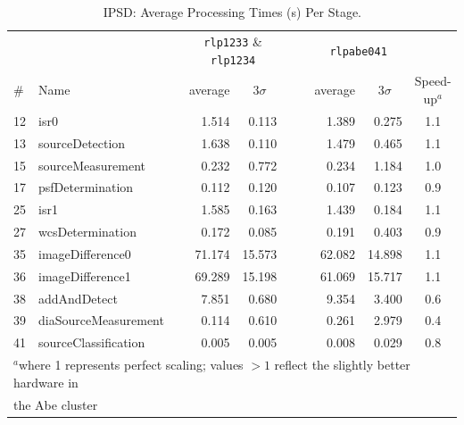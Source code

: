 \begin{table}[htbp]
\begin{center}
\caption{IPSD: Average Processing Times (s) Per Stage. 
\label{ex:tbl:allscislices}}
\vspace{\baselineskip}
\begin{tabular}{llcrrc|crr|c}
\hline\hline
   &      && \multicolumn{2}{c}{{\tt rlp1233} \& {\tt rlp1234}} 
         &&& \multicolumn{2}{c|}{{\tt rlpabe041}} & \\
\# & Name && \multicolumn{1}{c}{average}&\multicolumn{1}{c}{$3\sigma$} 
         &&& \multicolumn{1}{c}{average}&\multicolumn{1}{c|}{$3\sigma$} 
   & Speed-up$^a$ \\ 
\hline
12 &                 isr0 &&  1.514 &  0.113 &&&  1.389 &  0.275 & 1.1 \\  %
13 &      sourceDetection &&  1.638 &  0.110 &&&  1.479 &  0.465 & 1.1 \\  %
15 &    sourceMeasurement &&  0.232 &  0.772 &&&  0.234 &  1.184 & 1.0 \\  %
17 &     psfDetermination &&  0.112 &  0.120 &&&  0.107 &  0.123 & 0.9 \\  %
25 &                 isr1 &&  1.585 &  0.163 &&&  1.439 &  0.184 & 1.1 \\  %
27 &     wcsDetermination &&  0.172 &  0.085 &&&  0.191 &  0.403 & 0.9 \\  %
35 &     imageDifference0 && 71.174 & 15.573 &&& 62.082 & 14.898 & 1.1 \\  %
36 &     imageDifference1 && 69.289 & 15.198 &&& 61.069 & 15.717 & 1.1 \\  %
38 &         addAndDetect &&  7.851 &  0.680 &&&  9.354 &  3.400 & 0.6 \\  %
39 & diaSourceMeasurement &&  0.114 &  0.610 &&&  0.261 &  2.979 & 0.4 \\  %
41 & sourceClassification &&  0.005 &  0.005 &&&  0.008 &  0.029 & 0.8 \\  %
\hline
\multicolumn{10}{l}{$^a$where 1 represents perfect scaling; values $> 1$ reflect the slightly better hardware in}  \\ 
\multicolumn{10}{l}{\phantom{$^a$}the Abe cluster}  \\ 
\end{tabular}
\end{center}
\end{table}

